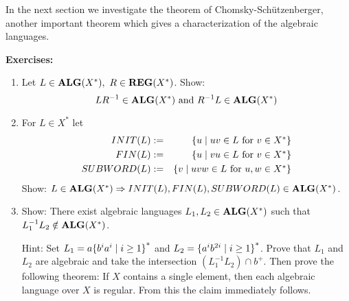 In the next section we investigate the theorem of Chomsky-Schützenberger,
another important theorem which gives a characterization of the algebraic languages.

{\bf Exercises:}

\begin{enumerate}
  \item Let $L\in \mbox{{\bf ALG}}(X^*),\ R\in \mbox{{\bf REG}}(X^*)$. Show:
  \[ LR^{-1}\in \mbox{{\bf ALG}}(X^*)\text{ and }R^{-1}L\in \mbox{{\bf ALG}}(X^*) \]
  
  \item For $L\in X^*$ let
  \begin{eqnarray*}
  INIT(L) &:=& \mbox{$\{u\mid uv\in L\text{ for }v\in X^*\}$}\\
  FIN(L) &:=& \mbox{$\{u\mid vu\in L\text{ for }v\in X^*\}$}\\
  SUBWORD(L) &:=& \mbox{$\{v\mid uvw\in L\text{ for }u,w\in X^*\}$}
  \end{eqnarray*}
  Show: $L\in \mbox{{\bf ALG}}(X^*) \Rightarrow INIT(L), FIN(L), SUBWORD(L)\in \mbox{{\bf ALG}}(X^*)$.
  
  \item Show: There exist algebraic languages $L_1, L_2\in \mbox{{\bf ALG}}(X^*)$ such that
  $L_1^{-1} L_2 \notin \mbox{{\bf ALG}}(X^*)$.
  
  Hint: Set $L_1 = a \mbox{$\{b^ia^i\mid i\geq 1\}$}^*$ and $L_2 =
  \mbox{$\{a^{i}b^{2i}\mid i\geq 1\}$}^*$. Prove that $L_1$ and $L_2$ are algebraic
  and take the intersection $(L_1^{-1}L_2)\cap b^+$. Then prove the following
  theorem: If $X$ contains a single element, then each algebraic language over
  $X$ is regular. From this the claim immediately follows.
\end{enumerate}
